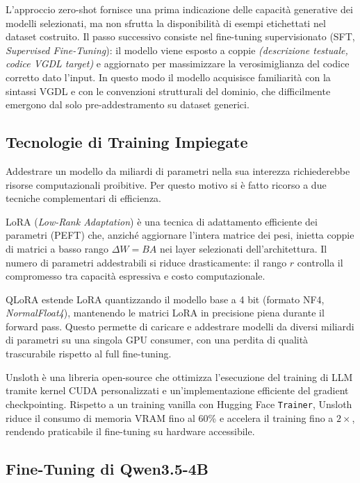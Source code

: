 \documentclass[final,5p,times,twocolumn]{elsarticle}
\begin{document}
L'approccio zero-shot fornisce una prima indicazione delle capacità generative dei modelli selezionati, ma non sfrutta la disponibilità di esempi etichettati nel dataset costruito. Il passo successivo consiste nel fine-tuning supervisionato (SFT, \textit{Supervised Fine-Tuning}): il modello viene esposto a coppie \textit{(descrizione testuale, codice VGDL target)} e aggiornato per massimizzare la verosimiglianza del codice corretto dato l'input. In questo modo il modello acquisisce familiarità con la sintassi VGDL e con le convenzioni strutturali del dominio, che difficilmente emergono dal solo pre-addestramento su dataset generici.

\subsection{Tecnologie di Training Impiegate}

Addestrare un modello da miliardi di parametri nella sua interezza richiederebbe risorse computazionali proibitive. Per questo motivo si è fatto ricorso a due tecniche complementari di efficienza.

LoRA (\textit{Low-Rank Adaptation}) è una tecnica di adattamento efficiente dei parametri (PEFT) che, anziché aggiornare l'intera matrice dei pesi, inietta coppie di matrici a basso rango $\Delta W = BA$ nei layer selezionati dell'architettura. Il numero di parametri addestrabili si riduce drasticamente: il rango $r$ controlla il compromesso tra capacità espressiva e costo computazionale.

QLoRA \citep{dettmers2023qlora} estende LoRA quantizzando il modello base a 4 bit (formato NF4, \textit{NormalFloat4}), mantenendo le matrici LoRA in precisione piena durante il forward pass. Questo permette di caricare e addestrare modelli da diversi miliardi di parametri su una singola GPU consumer, con una perdita di qualità trascurabile rispetto al full fine-tuning.

Unsloth \citep{unsloth} è una libreria open-source che ottimizza l'esecuzione del training di LLM tramite kernel CUDA personalizzati e un'implementazione efficiente del gradient checkpointing. Rispetto a un training vanilla con Hugging Face \texttt{Trainer}, Unsloth riduce il consumo di memoria VRAM fino al 60\% e accelera il training fino a $2\times$, rendendo praticabile il fine-tuning su hardware accessibile.

\subsection{Fine-Tuning di Qwen3.5-4B}
\end{document}
